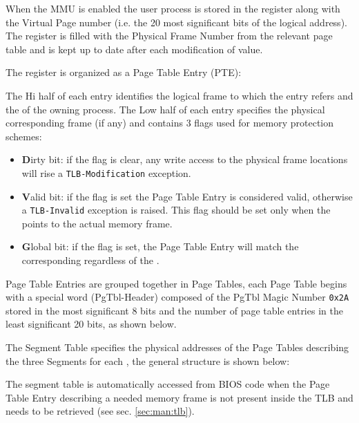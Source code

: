 When the MMU is enabled the user process  is stored in the  register along with the Virtual Page number (i.e. the 20 most significant bits of the logical address). The  register is filled with the Physical Frame Number from the relevant page table and is kept up to date after each modification of  value.

\label{sec:man:pageTable}
The  register is organized as a Page Table Entry (PTE):


The Hi half of each entry identifies the logical frame to which the entry refers and the  of the owning process.
The Low half of each entry specifies the physical corresponding frame (if any) and contains 3 flags used for memory protection schemes:
\begin{itemize}
	\item \textbf{D}irty bit: if the flag is clear, any write access to the physical frame locations will rise a \texttt{TLB-Modification} exception.
\item \textbf{V}alid bit: if the flag is set the Page Table Entry is considered valid, otherwise a \texttt{TLB-Invalid} exception is raised.
	This flag should be set only when the  points to the actual memory frame.
\item \textbf{G}lobal bit: if the flag is set, the Page Table Entry will match the corresponding  regardless of the .
\end{itemize}

Page Table Entries are grouped together in Page Tables, each Page Table begins with a special word (PgTbl-Header) composed of the PgTbl Magic Number \texttt{0x2A} stored in the most significant 8 bits and the number of page table entries in the least significant 20 bits, as shown below.



\label{sec:man:segmentTable}
The Segment Table specifies the physical addresses of the Page Tables describing the three Segments for each , the general structure is shown below:


The segment table is automatically accessed from BIOS code when the Page Table Entry describing a needed memory frame is not present inside the TLB and needs to be retrieved (see sec. \ref{sec:man:tlb}).


